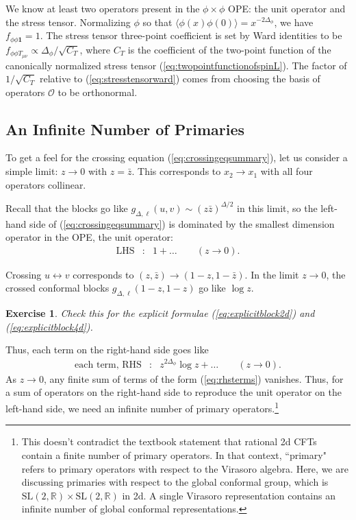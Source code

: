 \documentclass[11pt]{ws-rv9x6}
\newcommand\be{\begin{eqnarray}}
\newcommand\ee{\end{eqnarray}}
\newcommand\f\phi
\newcommand\cO{\mathcal{O}}
\newcommand\<\langle
\renewcommand\>\rangle
\newcommand\R{\mathbb{R}}
\renewcommand\.{\cdot}
\newcommand\x\times
\newcommand\De{\Delta}
\newtheorem{exercise}{Exercise}[section]
\begin{document}
We know at least two operators present in the $\f\x\f$ OPE: the unit operator and the stress tensor.  Normalizing $\f$ so that $\<\f(x)\f(0)\>=x^{-2\De_\f}$, we have $f_{\f\f\mathbf{1}}=1$.  The stress tensor three-point coefficient is set by Ward identities to be $f_{\f\f T_{\mu\nu}}\propto \De_\f/\sqrt{C_T}$, where $C_T$ is the coefficient of the two-point function of the canonically normalized stress tensor (\ref{eq:twopointfunctionofspinL}).  The factor of $1/\sqrt{C_T}$ relative to (\ref{eq:stresstensorward}) comes from choosing the basis of operators $\cO$ to be orthonormal.


\subsection{An Infinite Number of Primaries}

To get a feel for the crossing equation (\ref{eq:crossingeqsummary}), let us consider a simple limit: $z\to 0$ with $z=\bar z$. This corresponds to $x_2\to x_1$ with all four operators collinear.

Recall that the blocks go like $g_{\De,\ell}(u,v)\sim (z\bar z)^{\De/2}$ in this limit, so the left-hand side of (\ref{eq:crossingeqsummary}) is dominated by the smallest dimension operator in the OPE, the unit operator:
\be
\mathrm{LHS} &:& 1+\dots \qquad(z\to 0).
\ee

Crossing $u\leftrightarrow v$ corresponds to $(z,\bar z)\to (1-z,1-\bar z)$.  In the limit $z\to 0$, the crossed conformal blocks $g_{\De,\ell}(1-z,1-z)$ go like $\log z$.
\begin{exercise}
Check this for the explicit formulae (\ref{eq:explicitblock2d}) and (\ref{eq:explicitblock4d}).
\end{exercise}
Thus, each term on the right-hand side goes like
\be
\label{eq:rhsterms}
\textrm{each term, RHS} &:& z^{2\De_\f}\log z + \dots \qquad(z\to 0).
\ee
As $z\to 0$, any finite sum of terms of the form (\ref{eq:rhsterms}) vanishes.  Thus, for a sum of operators on the right-hand side to reproduce the unit operator on the left-hand side, we need an infinite number of primary operators.\footnote{This doesn't contradict the textbook statement that rational 2d CFTs contain a finite number of primary operators.  In that context, ``primary" refers to primary operators with respect to the Virasoro algebra.  Here, we are discussing primaries with respect to the global conformal group, which is $\mathrm{SL}(2,\R)\x\mathrm{SL}(2,\R)$ in 2d.  A single Virasoro representation contains an infinite number of global conformal representations.}
\end{document}
